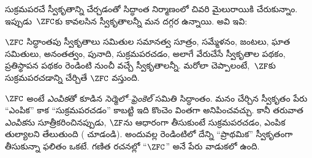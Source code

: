 \documentclass[../../../include/open-logic-section]{subfiles}
\begin{document}

సుక్రమపరచే స్వీకృతాన్ని చేర్చడంతో
సిద్ధాంత నిర్మాణంలో చివరి మైలురాయికి చేరుకున్నాం. ఇప్పుడు~$\ZFC$కు కావలసిన
స్వీకృతాలన్నీ మన దగ్గర ఉన్నాయి. అవి ఇవి:

\begin{defn}
$\ZFC$ సిద్ధాంతపు స్వీకృతాలు సమితుల సమానత్వ సూత్రం,
సమ్మేళనం, జంటలు, ఘాత సమితులు, అనంతత్వం, పునాది,
సుక్రమపరచడం, అలాగే వేరుచేసే స్వీకృతాల పథకం, ప్రతిస్థాపన పథకం రెండింటి నుంచీ వచ్చే స్వీకృతాలన్నీ.
మరోలా చెప్పాలంటే,~$\ZF$కు సుక్రమపరచడాన్ని చేర్చితే $\ZFC$ వస్తుంది.
\end{defn}

$\ZFC$ అంటే \emph{ఎంపిక}తో కూడిన \emph{సెర్మెలో--ఫ్రెంకెల్}
సమితి సిద్ధాంతం. మనం చేర్చిన స్వీకృతం పేరు ``ఎంపిక'' కాక
``సుక్రమపరచడం'' కాబట్టి ఇది కొంచెం వింతగా అనిపించవచ్చు.
కానీ తరువాత \emph{ఎంపిక}ను సూత్రీకరించినప్పుడు,
$\ZF$ను ఆధారంగా తీసుకుంటే సుక్రమపరచడం, ఎంపిక తుల్యాలని తేలుతుంది
( చూడండి). అందువల్ల
రెండింటిలో దేన్ని ``ప్రాథమిక'' స్వీకృతంగా తీసుకున్నా ఫలితం ఒకటే.
గణిత రచనల్లో ``$\ZFC$'' అనే పేరు వాడుకలో ఉంది.
\end{document}
